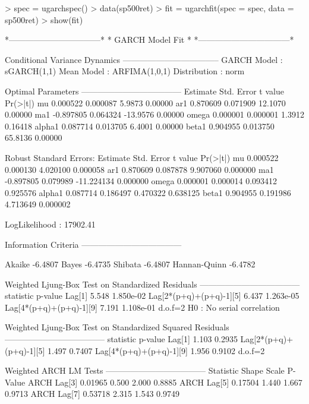 \begin{Schunk}
\begin{Sinput}
> spec = ugarchspec()
> data(sp500ret)
> fit = ugarchfit(spec = spec, data = sp500ret)
> show(fit)
\end{Sinput}
\begin{Soutput}
*---------------------------------*
*          GARCH Model Fit        *
*---------------------------------*

Conditional Variance Dynamics
-----------------------------------
GARCH Model	: sGARCH(1,1)
Mean Model	: ARFIMA(1,0,1)
Distribution	: norm

Optimal Parameters
------------------------------------
        Estimate  Std. Error  t value Pr(>|t|)
mu      0.000522    0.000087   5.9873  0.00000
ar1     0.870609    0.071909  12.1070  0.00000
ma1    -0.897805    0.064324 -13.9576  0.00000
omega   0.000001    0.000001   1.3912  0.16418
alpha1  0.087714    0.013705   6.4001  0.00000
beta1   0.904955    0.013750  65.8136  0.00000

Robust Standard Errors:
        Estimate  Std. Error    t value Pr(>|t|)
mu      0.000522    0.000130   4.020100 0.000058
ar1     0.870609    0.087878   9.907060 0.000000
ma1    -0.897805    0.079989 -11.224134 0.000000
omega   0.000001    0.000014   0.093412 0.925576
alpha1  0.087714    0.186497   0.470322 0.638125
beta1   0.904955    0.191986   4.713649 0.000002

LogLikelihood : 17902.41

Information Criteria
------------------------------------

Akaike       -6.4807
Bayes        -6.4735
Shibata      -6.4807
Hannan-Quinn -6.4782

Weighted Ljung-Box Test on Standardized Residuals
------------------------------------
                        statistic   p-value
Lag[1]                      5.548 1.850e-02
Lag[2*(p+q)+(p+q)-1][5]     6.437 1.263e-05
Lag[4*(p+q)+(p+q)-1][9]     7.191 1.108e-01
d.o.f=2
H0 : No serial correlation

Weighted Ljung-Box Test on Standardized Squared Residuals
------------------------------------
                        statistic p-value
Lag[1]                      1.103  0.2935
Lag[2*(p+q)+(p+q)-1][5]     1.497  0.7407
Lag[4*(p+q)+(p+q)-1][9]     1.956  0.9102
d.o.f=2

Weighted ARCH LM Tests
------------------------------------
            Statistic Shape Scale P-Value
ARCH Lag[3]   0.01965 0.500 2.000  0.8885
ARCH Lag[5]   0.17504 1.440 1.667  0.9713
ARCH Lag[7]   0.53718 2.315 1.543  0.9749


\end{Soutput}
\end{Schunk}
